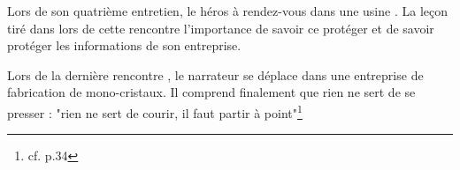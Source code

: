 Lors de son quatrième entretien, le héros à rendez-vous dans une usine . La leçon tiré dans lors de cette rencontre l'importance de savoir ce protéger et de savoir protéger les informations de son entreprise.

Lors de la dernière rencontre , le narrateur se déplace dans une entreprise de fabrication de mono-cristaux. Il comprend finalement que rien ne sert de se presser : "rien ne sert de courir, il faut partir à point"\footnote{cf. p.34}
 